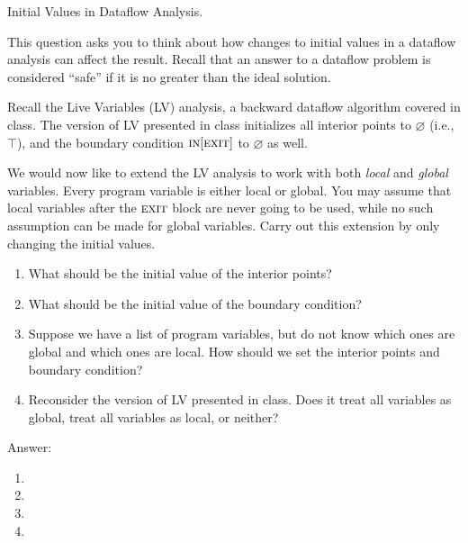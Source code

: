 \begin{problem}
Initial Values in Dataflow Analysis.

\item This question asks you to think about how changes to initial values in a dataflow analysis can affect the result. Recall that an answer to a dataflow problem is considered ``safe'' if it is no greater than the ideal solution.

\smallskip

\begin{problempart}
	Recall the Live Variables (LV) analysis, a backward dataflow algorithm covered in class. The version of LV presented in class initializes all interior points to $\varnothing$ (i.e., $\top$), and the boundary condition $\textsc{in}[\textsc{exit}]$ to $\varnothing$ as well.

	We would now like to extend the LV analysis to work with both \emph{local} and \emph{global} variables. Every program variable is either local or global.
	You may assume that local variables after the $\textsc{exit}$ block are never going to be used, while no such assumption can be made for global variables. Carry out this extension by only changing the initial values.
	\begin{enumerate}
		\item What should be the initial value of the interior points?
		\item What should be the initial value of the boundary condition?
		\item Suppose we have a list of program variables, but do not know which ones are global and which ones are local. How should we set the interior points and boundary condition?
		\item Reconsider the version of LV presented in class. Does it treat all variables as global, treat all variables as local, or neither?
	\end{enumerate}

	\item Answer:
	\begin{enumerate}
		\item {\color{red}{Set all interior points to $\Phi = \top$}}
		\item {\color{red}{Initialize the boundary condition to the set of global variables.}}
		\item {\color{red}{For safety, assume all program variables are global. Initialize the boundary condition
			      to the universal set (i.e., $\bot$). This is safe since $\bot$ is no greater than any other set,
			      including the actual set of global variables.}}
		\item {\color{red}{The version of LV presented in class initializes the boundary condition to $\Phi$, and so
			      assumes the set of global variables is $\Phi$. In other words, it treats all variables as local.}}
	\end{enumerate}



\end{problempart}
\end{problem}
